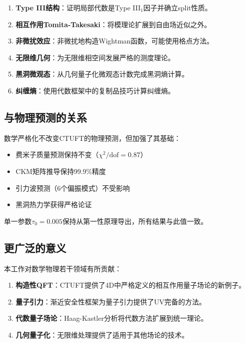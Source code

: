 \begin{enumerate}
    \item \textbf{Type III结构}：证明局部代数是Type III$_1$因子并确立split性质。
    
    \item \textbf{相互作用Tomita-Takesaki}：将模理论扩展到自由场近似之外。
    
    \item \textbf{非微扰效应}：非微扰地构造Wightman函数，可能使用格点方法。
    
    \item \textbf{无限维几何}：为无限维相空间发展严格的测度理论。
    
    \item \textbf{黑洞微观态}：从几何量子化微观态计数完成黑洞熵计算。
    
    \item \textbf{纠缠熵}：使用代数框架中的复制品技巧计算纠缠熵。
\end{enumerate}

\subsection{与物理预测的关系}

数学严格化不改变CTUFT的物理预测，但加强了其基础：

\begin{itemize}
    \item 费米子质量预测保持不变（$\chi^2/\text{dof} = 0.87$）
    \item CKM矩阵推导保持99.9\%精度
    \item 引力波预测（6个偏振模式）不受影响
    \item 黑洞热力学获得严格论证
\end{itemize}

单一参数$\tau_0 = 0.005$保持从第一性原理导出，所有结果与此值一致。

\subsection{更广泛的意义}

本工作对数学物理若干领域有所贡献：

\begin{enumerate}
    \item \textbf{构造性QFT}：CTUFT提供了4D中严格定义的相互作用量子场论的新例子。
    
    \item \textbf{量子引力}：渐近安全性框架为量子引力提供了UV完备的方法。
    
    \item \textbf{代数量子场论}：Haag-Kastler分析将代数方法扩展到统一理论。
    
    \item \textbf{几何量子化}：无限维处理提供了适用于其他场论的技术。
\end{enumerate}

